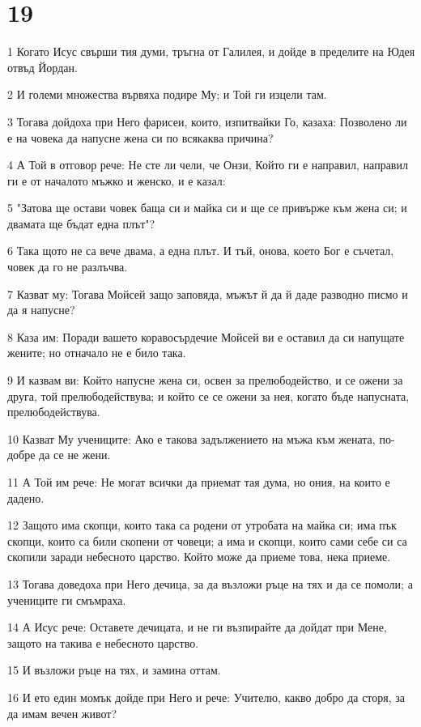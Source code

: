 \chapter{19}

\par 1 Когато Исус свърши тия думи, тръгна от Галилея, и дойде в пределите на Юдея отвъд Йордан.
\par 2 И големи множества вървяха подире Му; и Той ги изцели там.
\par 3 Тогава дойдоха при Него фарисеи, които, изпитвайки Го, казаха: Позволено ли е на човека да напусне жена си по всякаква причина?
\par 4 А Той в отговор рече: Не сте ли чели, че Онзи, Който ги е направил, направил ги е от началото мъжко и женско, и е казал:
\par 5 "Затова ще остави човек баща си и майка си и ще се привърже към жена си; и двамата ще бъдат една плът"?
\par 6 Така щото не са вече двама, а една плът. И тъй, онова, което Бог е съчетал, човек да го не разлъчва.
\par 7 Казват му: Тогава Мойсей защо заповяда, мъжът й да й даде разводно писмо и да я напусне?
\par 8 Каза им: Поради вашето коравосърдечие Мойсей ви е оставил да си напущате жените; но отначало не е било така.
\par 9 И казвам ви: Който напусне жена си, освен за прелюбодейство, и се ожени за друга, той прелюбодействува; и който се се ожени за нея, когато бъде напусната, прелюбодействува.
\par 10 Казват Му учениците: Ако е такова задължението на мъжа към жената, по-добре да се не жени.
\par 11 А Той им рече: Не могат всички да приемат тая дума, но ония, на които е дадено.
\par 12 Защото има скопци, които така са родени от утробата на майка си; има пък скопци, които са били скопени от човеци; а има и скопци, които сами себе си са скопили заради небесното царство. Който може да приеме това, нека приеме.
\par 13 Тогава доведоха при Него дечица, за да възложи ръце на тях и да се помоли; а учениците ги смъмраха.
\par 14 А Исус рече: Оставете дечицата, и не ги възпирайте да дойдат при Мене, защото на такива е небесното царство.
\par 15 И възложи ръце на тях, и замина оттам.
\par 16 И ето един момък дойде при Него и рече: Учителю, какво добро да сторя, за да имам вечен живот?
